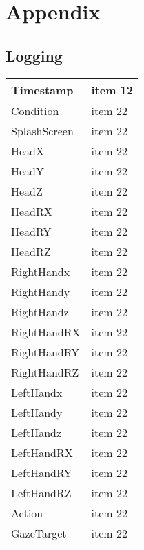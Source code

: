 \section{Appendix}

\subsection{Logging}
\begin{tabu} to 0.8\textwidth { | X[l] | X[c] | }
 \hline
 Timestamp& item 12 \\
 \hline
 Condition  & item 22    \\
\hline
 SplashScreen  & item 22    \\
\hline
 HeadX  & item 22    \\
\hline
 HeadY  & item 22    \\
\hline
 HeadZ  & item 22    \\
\hline
 HeadRX  & item 22    \\
\hline
 HeadRY  & item 22    \\
\hline
 HeadRZ  & item 22    \\
\hline
 RightHandx  & item 22    \\
\hline
 RightHandy  & item 22    \\
\hline
 RightHandz  & item 22    \\
\hline
 RightHandRX  & item 22    \\
\hline
 RightHandRY  & item 22    \\
\hline
 RightHandRZ  & item 22    \\
\hline
LeftHandx  & item 22    \\
\hline
 LeftHandy  & item 22    \\
\hline
 LeftHandz  & item 22    \\
\hline
 LeftHandRX  & item 22    \\
\hline
 LeftHandRY  & item 22    \\
\hline
 LeftHandRZ  & item 22    \\
\hline
 Action  & item 22    \\
\hline
 GazeTarget  & item 22    \\
\hline
\end{tabu}
